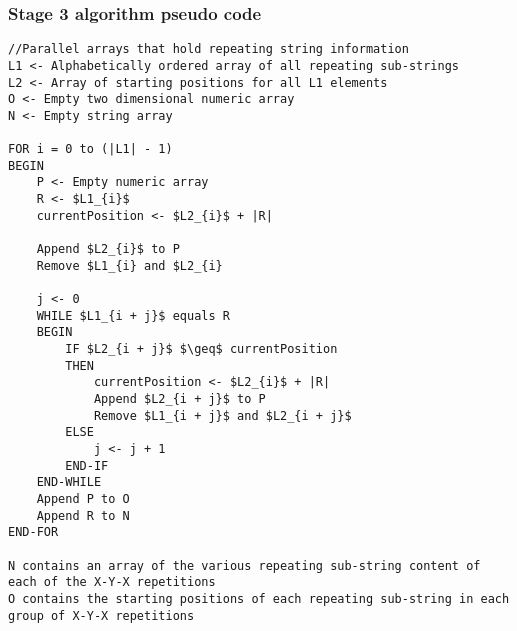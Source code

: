 \documentclass[12pt]{article}
\begin{document}
\begin{flushleft}
	\subsubsection{Stage 3 algorithm pseudo code}
	
\begin{lstlisting}
//Parallel arrays that hold repeating string information
L1 <- Alphabetically ordered array of all repeating sub-strings 
L2 <- Array of starting positions for all L1 elements
O <- Empty two dimensional numeric array
N <- Empty string array

FOR i = 0 to (|L1| - 1)
BEGIN
	P <- Empty numeric array
	R <- $L1_{i}$
	currentPosition <- $L2_{i}$ + |R|
	
	Append $L2_{i}$ to P	
	Remove $L1_{i} and $L2_{i}	
	
	j <- 0		
	WHILE $L1_{i + j}$ equals R
	BEGIN
		IF $L2_{i + j}$ $\geq$ currentPosition
		THEN 
			currentPosition <- $L2_{i}$ + |R|
			Append $L2_{i + j}$ to P
			Remove $L1_{i + j}$ and $L2_{i + j}$			
		ELSE
			j <- j + 1
		END-IF		
	END-WHILE
	Append P to O
	Append R to N  
END-FOR

N contains an array of the various repeating sub-string content of each of the X-Y-X repetitions
O contains the starting positions of each repeating sub-string in each group of X-Y-X repetitions 
\end{lstlisting} 
\end{flushleft}
\end{document}
